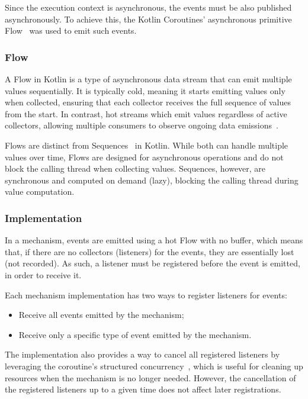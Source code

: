 Since the execution context is asynchronous, the events must be also published asynchronously.
To achieve this, the Kotlin Coroutines' asynchronous primitive Flow~\cite{kotlin-flow} was used to emit such events.

\subsubsection{Flow}\label{subsubsec:flow}

A Flow in Kotlin is a type of asynchronous data stream that can emit multiple values sequentially.
It is typically cold, meaning it starts emitting values only when collected,
ensuring that each collector receives the full sequence of values from the start.
In contrast, hot streams which emit values regardless of active collectors,
allowing multiple consumers
to observe ongoing data emissions~\cite{android-stateflow-sharedflow, kotlin-flow}.

Flows are distinct from Sequences~\cite{kotlin-sequences} in Kotlin.
While both can handle multiple values over time,
Flows are designed for asynchronous operations and do not block the calling thread when collecting values.
Sequences, however, are synchronous and computed on demand (lazy), blocking the calling thread during value computation.

\subsubsection{Implementation}\label{subsubsec:event-publishing-implementation}

In a mechanism, events are emitted using a hot Flow with no buffer, which means that, if there are no collectors (listeners) for the events, they are essentially lost (not recorded).
As such, a listener must be registered before the event is emitted, in order to receive it.

Each mechanism implementation has two ways to register listeners for events:

\begin{itemize}
    \item Receive all events emitted by the mechanism;
    \item Receive only a specific type of event emitted by the mechanism.
\end{itemize}

The implementation also provides a way to cancel all registered listeners by leveraging the coroutine's structured concurrency~\cite{kotlin-coroutines}, which is useful for cleaning up resources when the mechanism is no longer needed.
However, the cancellation of the registered listeners up to a given time does not affect later registrations.


